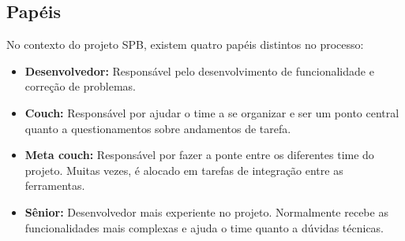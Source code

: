 \documentclass[a4paper, 11pt]{article}
\begin{document}
\begin{table}[h]
    \caption{Atividades relacionadas a etapa de Desenvolver funcionalidades}
    \label{tab:atividades_desenvolver}
\end{table}

\subsection*{Papéis}

No contexto do projeto SPB, existem quatro papéis distintos no processo:

\begin{itemize}
    \item \textbf{Desenvolvedor:} Responsável pelo desenvolvimento de
        funcionalidade e correção de problemas.
    \item \textbf{Couch:} Responsável por ajudar o time a se organizar e ser
    um ponto central quanto a questionamentos sobre andamentos de tarefa.
    \item \textbf{Meta couch:} Responsável por fazer a ponte entre os
    diferentes time do projeto. Muitas vezes, é alocado em tarefas de
    integração entre as ferramentas.
    \item \textbf{Sênior:} Desenvolvedor mais experiente no projeto.
    Normalmente recebe as funcionalidades mais complexas e ajuda o time
    quanto a dúvidas técnicas.
\end{itemize}
\end{document}
